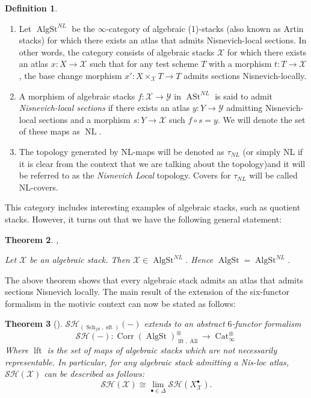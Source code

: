 \documentclass[14pt]{article}
\newtheorem{theorem}{Theorem}[subsection]
\theoremstyle{definition}
\newtheorem{definition}[theorem]{Definition}
\newcommand{\op}[1]{\operatorname{#1}}
\newcommand{\Schf}{\op{Sch}_{fd}}
\newcommand{\X}{\mathcal{X}}
\newcommand{\bb}{\bullet}
\numberwithin{subsection}{section}
\newcommand{\SH}{\mathcal{SH}}
\newcommand{\Y}{\mathcal{Y}}
\begin{document}
	\begin{definition}\cite[Definition 2.1.4]{Chowdhury}
		\begin{enumerate}
			\item [$ (i) $]	Let $ \op{AlgSt}^{NL} $ be the $\infty$-category of algebraic (1)-stacks (also known as Artin stacks) for which there exists an atlas that admits Nisnevich-local sections. In other words, the category consists of algebraic stacks $\X$ for which there exists an atlas $ x: X \to \X$ such that for any test scheme $T$ with a morphism $ t: T \to \X$, the base change morphism $x': X \times_{\X} T \to T$ admits sections Nisnevich-locally.     
			\item [$ (ii) $]			 A morphism of algebraic stacks $f : \X \to \Y$ in $\op{ASt}^{ NL}$ is said to admit \textit{Nisnevich-local sections} if there exists an atlas $ y : Y \to \Y$ admitting Nisnevich-local sections and a morphism $s : Y \to \X$ such $ f\circ s = y$. We will denote the set of these maps as $ \op{NL} $.
			\item [$(iii)$] The topology generated by NL-maps will be denoted as $\tau_{NL}$ (or simply NL if it is clear from the context that we are talking about the topology)and it will be referred to as the \textit{Nisnevich Local} topology. Covers for $\tau_{NL}$ will be called NL-covers.
		\end{enumerate}
        \end{definition}
 This category includes interesting examples of algebraic stacks, such as quotient stacks.  However, it turns out that we have the following general statement:
 \begin{theorem}\cite[Theorem A.1]{deshmukh2025motivichomotopytypealgebraic},\cite[Proposition 2.4] {chowdhury2025nonrepresentablesixfunctorformalisms}

 Let $\X$ be an algebraic stack. Then $\X  \in \op{AlgSt}^{NL}$. Hence $\op{AlgSt}= \op{AlgSt}^{NL}$.
     
 \end{theorem}

The above theorem shows that every algebraic stack admits an atlas that admits sections Nisnevich locally. The main result of the extension of the six-functor formalism in the motivic context can now be stated as follows:
\begin{theorem}[\cite{Chowdhury,Khan-Ravi_Generalised_Coh_Stacks}]\label{SHonalgstacks}
$\SH_{(\Schf,\op{sft})}(-)$ extends to an abstract $6$-functor formalism 
\begin{equation}
    \SH(-) : \op{Corr}(\op{AlgSt})^{\otimes}_{\op{lft},\op{All}} \to \op{Cat}^{\otimes}_{\infty}
\end{equation}
Where $\op{lft}$ is the set of maps of algebraic stacks which are not necessarily representable. In particular, for any algebraic stack admitting a Nis-loc atlas, $\SH(\X)$ can be described as follows:
\begin{equation}
    \SH(\X) \cong \op{lim}_{\bb \in \Delta} \SH(X^{\bb}_{\X}).
    \end{equation}

\end{theorem}
\end{document}
